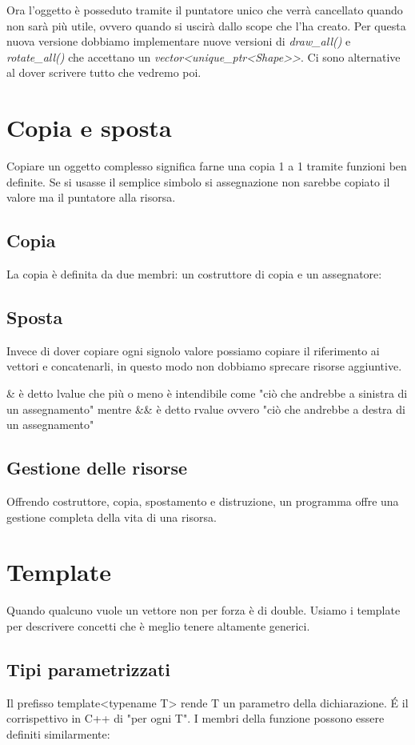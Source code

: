\documentclass[11pt,a4paper]{book}
\begin{document}
Ora l'oggetto è posseduto tramite il puntatore unico che verrà cancellato quando non sarà più utile, ovvero quando si uscirà dallo scope che l'ha creato. Per questa nuova versione dobbiamo implementare nuove versioni di \emph{draw\_all()} e \emph{rotate\_all()} che accettano un \emph{vector<unique\_ptr<Shape>>}. Ci sono alternative al dover scrivere tutto che vedremo poi.

\section{Copia e sposta}
Copiare un oggetto complesso significa farne una copia 1 a 1 tramite funzioni ben definite. Se si usasse il semplice simbolo si assegnazione non sarebbe copiato il valore ma il puntatore alla risorsa.

\subsection{Copia}
La copia è definita da due membri: un costruttore di copia e un assegnatore:
\label{code: 041}

\subsection{Sposta}
\label{code: 042}
Invece di dover copiare ogni signolo valore possiamo copiare il riferimento ai vettori e concatenarli, in questo modo non dobbiamo sprecare risorse aggiuntive.

\& è detto lvalue che più o meno è intendibile come "ciò che andrebbe a sinistra di un assegnamento" mentre \&\& è detto rvalue ovvero "ciò che andrebbe a destra di un assegnamento"

\subsection{Gestione delle risorse}
Offrendo costruttore, copia, spostamento e distruzione, un programma offre una gestione completa della vita di una risorsa.

\section{Template}
Quando qualcuno vuole un vettore non per forza è di double. Usiamo i template per descrivere concetti che è meglio tenere altamente generici.

\subsection{Tipi parametrizzati}
\label{code: 043}
Il prefisso template<typename T> rende T un parametro della dichiarazione. É il corrispettivo in C++ di "per ogni T".
I membri della funzione possono essere definiti similarmente:
\label{code: 044}
\end{document}
